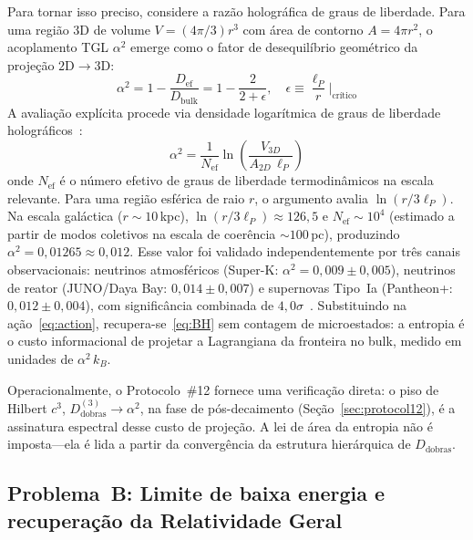 \documentclass[12pt,a4paper,twocolumn]{article}
\newcommand{\alphaii}{\alpha^{2}}
\newcommand{\Dfolds}{D_{\text{dobras}}}
\begin{document}
Para tornar isso preciso, considere a razão holográfica de graus de liberdade.
Para uma região 3D de volume $V = (4\pi/3)r^3$ com área de contorno $A = 4\pi r^2$,
o acoplamento TGL $\alphaii$ emerge como o fator de desequilíbrio geométrico da
projeção $2\text{D} \to 3\text{D}$:
\begin{equation}
\alphaii = 1 - \frac{D_{\text{ef}}}{D_{\text{bulk}}} = 1 -
\frac{2}{2+\epsilon}, \quad \epsilon \equiv
\frac{\ell_P}{r}\Big|_{\text{crítico}}
\label{eq:alpha_derivation}
\end{equation}
A avaliação explícita procede via densidade logarítmica de graus de liberdade
holográficos~\cite{Miguel2026Acoplamento}:
\begin{equation}
\alphaii = \frac{1}{N_{\text{ef}}} \ln\!\left(\frac{V_{3D}}{A_{2D}\,\ell_P}\right)
\label{eq:alpha_explicit}
\end{equation}
onde $N_{\text{ef}}$ é o número efetivo de graus de liberdade termodinâmicos
na escala relevante. Para uma região esférica de raio $r$, o argumento avalia
$\ln(r/3\ell_P)$. Na escala galáctica ($r \sim 10$\,kpc),
$\ln(r/3\ell_P) \approx 126{,}5$ e $N_{\text{ef}} \sim 10^4$ (estimado a partir
de modos coletivos na escala de coerência $\sim 100$\,pc), produzindo
$\alphaii = 0{,}01265 \approx 0{,}012$. Esse valor foi validado independentemente
por três canais observacionais: neutrinos atmosféricos (Super-K:
$\alphaii = 0{,}009 \pm 0{,}005$), neutrinos de reator (JUNO/Daya Bay:
$0{,}014 \pm 0{,}007$) e supernovas Tipo~Ia (Pantheon+: $0{,}012 \pm 0{,}004$),
com significância combinada de $4{,}0\sigma$~\cite{Miguel2026Acoplamento}.
Substituindo na ação~\eqref{eq:action}, recupera-se~\eqref{eq:BH} sem
contagem de microestados: a entropia é o custo informacional de projetar a
Lagrangiana da fronteira no bulk, medido em unidades de $\alphaii\,k_B$.

Operacionalmente, o Protocolo~\#12 fornece uma verificação direta: o piso de
Hilbert $c^3$, $D_{\text{dobras}}^{(3)} \to \alphaii$, na fase de pós-decaimento
(Seção~\ref{sec:protocol12}), é a assinatura espectral desse custo de projeção.
A lei de área da entropia não é imposta---ela é lida a partir da convergência
da estrutura hierárquica de $\Dfolds$.

\subsection{Problema~B: Limite de baixa energia e recuperação da Relatividade Geral}
\label{sec:problem_b}
\end{document}
